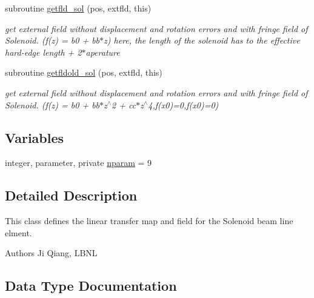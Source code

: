 \begin{DoxyCompactItemize}
subroutine \mbox{\hyperlink{namespacesolclass_a7a865f7ab4470f9bff328ed98aacd7c8}{getfld\+\_\+sol}} (pos, extfld, this)
\begin{DoxyCompactList}\small\item\em get external field without displacement and rotation errors and with fringe field of Solenoid. (f(z) = b0 + bb$\ast$z) here, the length of the solenoid has to the effective hard-\/edge length + 2$\ast$aperature \end{DoxyCompactList}\item 
subroutine \mbox{\hyperlink{namespacesolclass_a592dd58600b2d6df21aab781e8faebac}{getfldold\+\_\+sol}} (pos, extfld, this)
\begin{DoxyCompactList}\small\item\em get external field without displacement and rotation errors and with fringe field of Solenoid. (f(z) = b0 + bb$\ast$z$^\wedge$2 + cc$\ast$z$^\wedge$4,f(x0)=0,f\textquotesingle{}(x0)=0) \end{DoxyCompactList}\end{DoxyCompactItemize}
\subsection*{Variables}
\begin{DoxyCompactItemize}
\item 
integer, parameter, private \mbox{\hyperlink{namespacesolclass_abb5af39a08a5ff2cbe713621b2727eaf}{nparam}} = 9
\end{DoxyCompactItemize}


\subsection{Detailed Description}
This class defines the linear transfer map and field for the Solenoid beam line elment. 

\begin{DoxyAuthor}{Authors}
Ji Qiang, L\+B\+NL 
\end{DoxyAuthor}


\subsection{Data Type Documentation}
\label{structsolclass_1_1sol}
